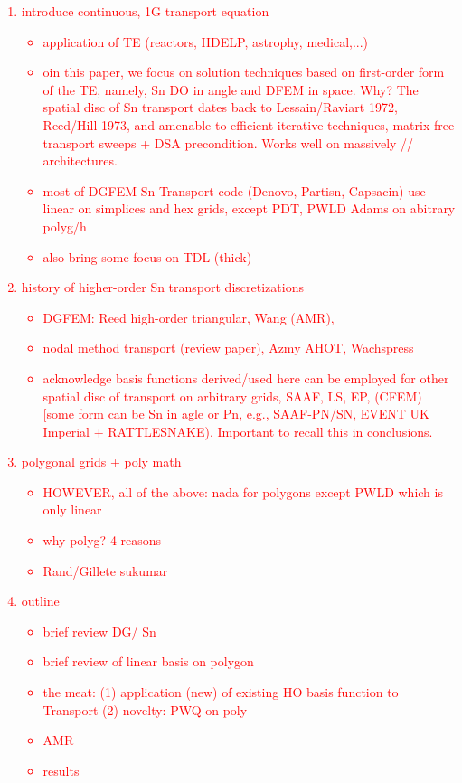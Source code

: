 \documentclass[preprint,10pt]{elsarticle}
\newcommand{\tcr}[1]{\textcolor{red}{#1}}
\begin{document}
\tcr
{
\begin{enumerate}
\item introduce continuous, 1G transport equation
\begin{itemize}
\item application of TE (reactors, HDELP, astrophy, medical,...)
\item oin this paper, we focus on solution techniques based on first-order form of the TE, namely, Sn DO in angle and DFEM in space. Why? The spatial disc of Sn transport dates back to Lessain/Raviart 1972, Reed/Hill 1973, and amenable to efficient iterative techniques, matrix-free transport sweeps + DSA precondition. Works well on massively // architectures.  
\item most of DGFEM Sn Transport code (Denovo, Partisn, Capsacin) use linear on simplices and hex grids, except PDT, PWLD Adams on abitrary polyg/h
\item also bring some focus on TDL (thick)
\end{itemize}
\item history of higher-order Sn transport discretizations
\begin{itemize}
\item DGFEM: Reed high-order triangular, Wang (AMR), 
\item nodal method transport (review paper), Azmy AHOT, Wachspress 
\item acknowledge basis functions derived/used here can be employed for other spatial disc of transport on arbitrary grids, SAAF, LS, EP, (CFEM) [some form can be Sn in agle or Pn, e.g., SAAF-PN/SN, EVENT UK Imperial  + RATTLESNAKE). Important to recall this in conclusions. 
\end{itemize}
\item polygonal grids + poly math
\begin{itemize}
\item HOWEVER, all of the above: nada for polygons except PWLD which is only linear
\item why polyg? 4 reasons 
\item Rand/Gillete sukumar
\end{itemize}
\item outline
\begin{itemize}
\item brief review DG/ Sn
\item brief review of linear basis on polygon
\item the meat: (1) application (new) of existing HO basis function to Transport (2) novelty: PWQ on poly
\item AMR
\item results
\end{itemize}
\end{enumerate}
}
\end{document}
